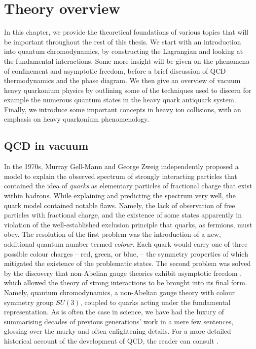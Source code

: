 \documentclass[11pt, a4paper, twoside]{book}
\newcommand{\brac}[1] {\!\left(#1\right)}
\begin{document}
\chapter{Theory overview}
\label{sec:theory_ov}
\onehalfspacing
In this chapter, we provide the theoretical foundations of various topics that will be important throughout the rest of this thesis. We start with an introduction into quantum chromodynamics, by constructing the Lagrangian and looking at the fundamental interactions. Some more insight will be given on the phenomena of confinement and asymptotic freedom, before a brief discussion of QCD thermodynamics and the phase diagram. We then give an overview of vacuum heavy quarkonium physics by outlining some of the techniques used to discern for example the numerous quantum states in the heavy quark antiquark system. Finally, we introduce some important concepts in heavy ion collisions, with an emphasis on heavy quarkonium phenomenology. 
\section{QCD in vacuum}
In the 1970s, Murray Gell-Mann and George Zweig independently proposed a model to explain the observed spectrum of strongly interacting particles that contained the idea of \emph{quarks} as elementary particles of fractional charge that exist within hadrons. While explaining and predicting the spectrum very well, the quark model contained notable flaws. Namely, the lack of observation of free particles with fractional charge, and the existence of some states apparently in violation of the well-established exclusion principle that quarks, as fermions, must obey. The resolution of the first problem was the introduction of a new, additional quantum number termed \emph{colour}. Each quark would carry one of three possible colour charges -- red, green, or blue, -- the symmetry properties of which mitigated the existence of the problematic states. The second problem was solved by the discovery that non-Abelian gauge theories exhibit asymptotic freedom \cite{Gross:1973id}, which allowed the theory of strong interactions to be brought into its final form. Namely, quantum chromodynamics, a non-Abelian gauge theory with colour symmetry group \(SU\brac{3}\), coupled to quarks acting under the fundamental representation. As is often the case in science, we have had the luxury of summarising decades of previous generations' work in a mere few sentences, glossing over the murky and often enlightening details. For a more detailed historical account of the development of QCD, the reader can consult \cite{Gross:1998jx}.
\end{document}
